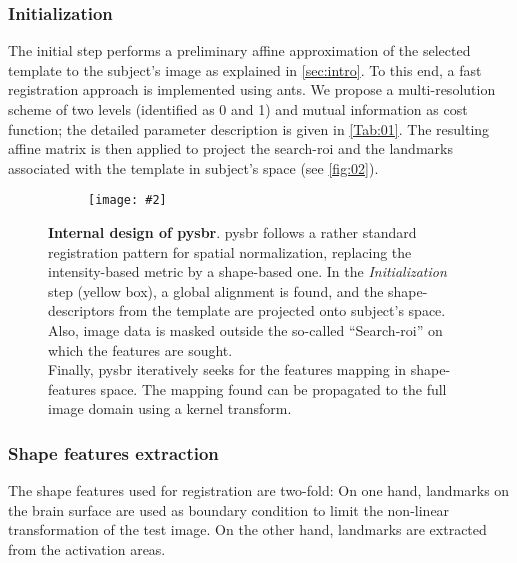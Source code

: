 \documentclass{frontiers}
\newcommand{\insertgraphic}[2]{\texttt{[image: \#2]}}
\newcommand{\insertgraphic}[2]{\texttt{[image: \#2]}}
\begin{document}
\subsubsection{Initialization}
\label{sec:meth_initialization}
The initial step performs a preliminary affine approximation of the selected
  template to the subject's image as explained in \autoref{sec:intro}.
To this end, a fast registration approach is implemented using \gls*{ants}.
We propose a multi-resolution scheme of two levels (identified as 0 and 1) and 
  mutual information as cost function; the detailed parameter description 
  is given in \autoref{Tab:01}.
The resulting affine matrix is then applied to project the search-\gls*{roi}
  and the landmarks associated with the template in
  subject's space (see \autoref{fig:02}).

\begin{figure*}[!ht]
\centering
  \begin{subfigure}[bt]{0.65\textwidth}
    \insertgraphic{width=\linewidth}{figures/02-RegistrationFlowDiagram}
  \end{subfigure}
  \hfill
  \begin{minipage}[bt]{0.30\textwidth}
  \caption{\label{fig:02}
  \textbf{Internal design of \gls*{pysbr}}. \Gls*{pysbr} follows a rather standard
  registration pattern for spatial normalization, replacing the intensity-based
  metric by a shape-based one. In the \emph{Initialization} step (yellow box),
  a global alignment is found, and the shape-descriptors from the template
  are projected onto subject's space. Also, image data is masked outside the
  so-called ``Search-\gls*{roi}'' on which the features are sought. \\
  Finally, \gls*{pysbr} iteratively seeks for the features mapping in
  shape-features space. The mapping found can be propagated to the full
  image domain using a kernel transform.
  }
  \end{minipage}
\end{figure*}


\subsubsection{Shape features extraction}
\label{sec:shape_features}

The shape features used for registration are two-fold:
On one hand, landmarks on the brain surface are used as boundary condition to limit the non-linear 
  transformation of the test image. 
On the other hand, landmarks are extracted from the activation areas. 
\end{document}
